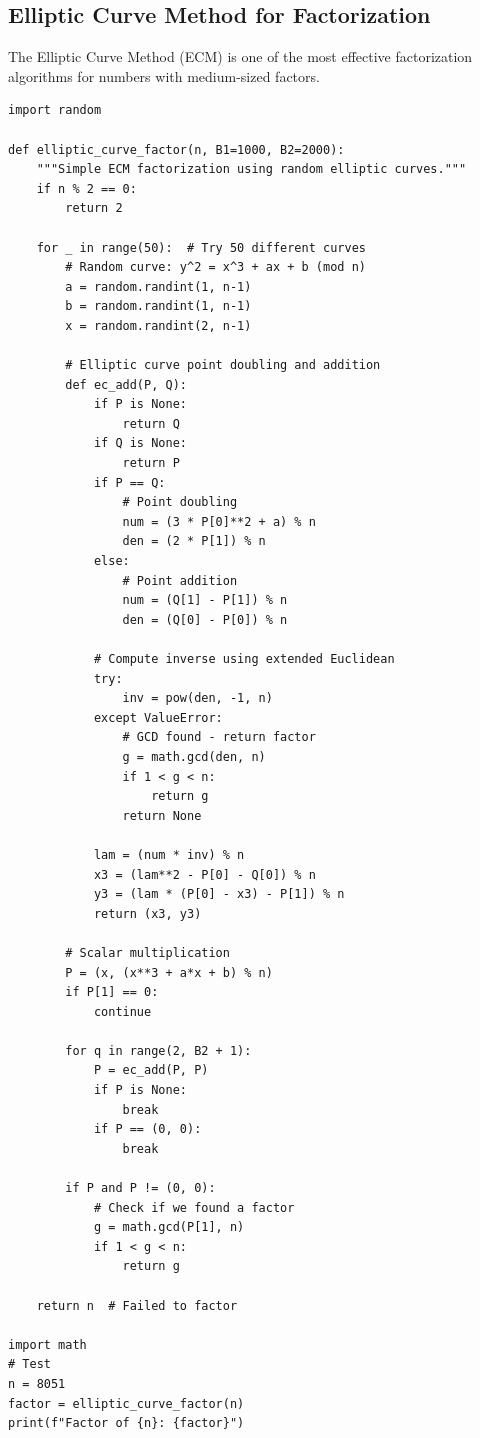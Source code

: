 \subsection{Elliptic Curve Method for Factorization}

The Elliptic Curve Method (ECM) is one of the most effective factorization
algorithms for numbers with medium-sized factors.

\begin{lstlisting}[caption={Elliptic curve factorization}, label=lst:ecm_factor]
import random

def elliptic_curve_factor(n, B1=1000, B2=2000):
    """Simple ECM factorization using random elliptic curves."""
    if n % 2 == 0:
        return 2
    
    for _ in range(50):  # Try 50 different curves
        # Random curve: y^2 = x^3 + ax + b (mod n)
        a = random.randint(1, n-1)
        b = random.randint(1, n-1)
        x = random.randint(2, n-1)
        
        # Elliptic curve point doubling and addition
        def ec_add(P, Q):
            if P is None:
                return Q
            if Q is None:
                return P
            if P == Q:
                # Point doubling
                num = (3 * P[0]**2 + a) % n
                den = (2 * P[1]) % n
            else:
                # Point addition
                num = (Q[1] - P[1]) % n
                den = (Q[0] - P[0]) % n
            
            # Compute inverse using extended Euclidean
            try:
                inv = pow(den, -1, n)
            except ValueError:
                # GCD found - return factor
                g = math.gcd(den, n)
                if 1 < g < n:
                    return g
                return None
            
            lam = (num * inv) % n
            x3 = (lam**2 - P[0] - Q[0]) % n
            y3 = (lam * (P[0] - x3) - P[1]) % n
            return (x3, y3)
        
        # Scalar multiplication
        P = (x, (x**3 + a*x + b) % n)
        if P[1] == 0:
            continue
            
        for q in range(2, B2 + 1):
            P = ec_add(P, P)
            if P is None:
                break
            if P == (0, 0):
                break
        
        if P and P != (0, 0):
            # Check if we found a factor
            g = math.gcd(P[1], n)
            if 1 < g < n:
                return g
    
    return n  # Failed to factor

import math
# Test
n = 8051
factor = elliptic_curve_factor(n)
print(f"Factor of {n}: {factor}")
\end{lstlisting}

